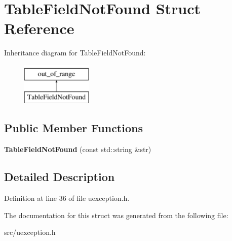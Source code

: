 \hypertarget{struct_table_field_not_found}{}\section{Table\+Field\+Not\+Found Struct Reference}
\label{struct_table_field_not_found}
Inheritance diagram for Table\+Field\+Not\+Found\+:\begin{figure}[H]
\begin{center}
\leavevmode
\includegraphics[height=2.000000cm]{struct_table_field_not_found}
\end{center}
\end{figure}
\subsection*{Public Member Functions}
\begin{DoxyCompactItemize}
\item 
\mbox{\label{struct_table_field_not_found_ae169abce20c581f32430e2a64b8471b4}} 
{\bfseries Table\+Field\+Not\+Found} (const std\+::string \&str)
\end{DoxyCompactItemize}


\subsection{Detailed Description}


Definition at line 36 of file uexception.\+h.



The documentation for this struct was generated from the following file\+:\begin{DoxyCompactItemize}
\item 
src/uexception.\+h\end{DoxyCompactItemize}
